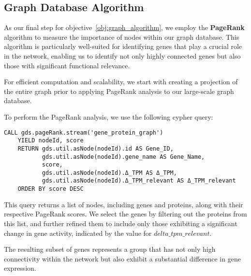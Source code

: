 \subsection{Graph Database Algorithm} \label{subsec:graph_database_algo}
As our final step for objective~\ref{obj:graph_algorithm},
we employ the \textbf{PageRank} algorithm to measure the importance of nodes within our graph database.
This algorithm is particularly well-suited for identifying genes that play a crucial role in the network,
enabling us to identify not only highly connected genes but also those with significant functional relevance.

For efficient computation and scalability,
we start with creating a projection of the entire graph prior to applying PageRank analysis to our large-scale graph database.

To perform the PageRank analysis, we use the following cypher query:
\begin{lstlisting}[language=Cypher, label={lst:pagerank}]
    CALL gds.pageRank.stream('gene_protein_graph')
    YIELD nodeId, score
    RETURN gds.util.asNode(nodeId).id AS Gene_ID,
           gds.util.asNode(nodeId).gene_name AS Gene_Name,
           score,
           gds.util.asNode(nodeId).Δ_TPM AS Δ_TPM,
           gds.util.asNode(nodeId).Δ_TPM_relevant AS Δ_TPM_relevant
    ORDER BY score DESC
\end{lstlisting}

This query returns a list of nodes, including genes and proteins, along with their respective PageRank scores.
We select the genes by filtering out the proteins from this list, and
further refined them to include only those exhibiting a significant change in gene activity,
indicated by the value for $delta\_tpm\_relevant$.

The resulting subset of genes represents a group that has not only high connectivity
within the network but also exhibit a substantial difference in gene expression.\\
